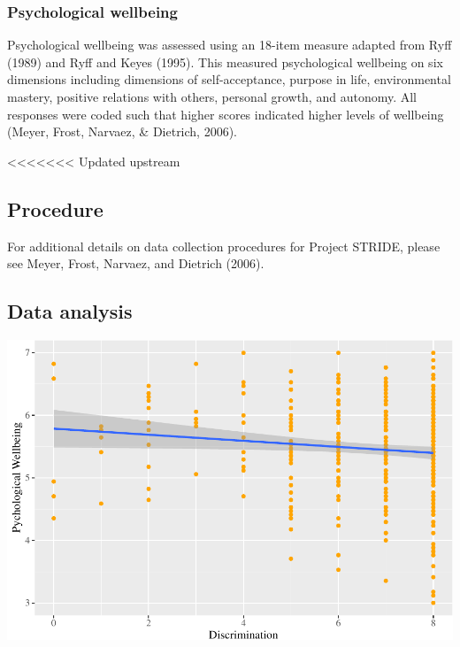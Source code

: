 \documentclass[
  english,
  man,floatsintext]{apa6}
\begin{document}
\hypertarget{psychological-wellbeing}{%
\subsubsection{Psychological wellbeing}\label{psychological-wellbeing}}

Psychological wellbeing was assessed using an 18-item measure adapted from Ryff (1989) and Ryff and Keyes (1995). This measured psychological wellbeing on six dimensions including dimensions of self-acceptance, purpose in life, environmental mastery, positive relations with others, personal growth, and autonomy. All responses were coded such that higher scores indicated higher levels of wellbeing (Meyer, Frost, Narvaez, \& Dietrich, 2006).

<<<<<<< Updated upstream
\hypertarget{procedure-1}{%
\subsection{Procedure}\label{procedure-1}}

For additional details on data collection procedures for Project STRIDE, please see Meyer, Frost, Narvaez, and Dietrich (2006).

\hypertarget{data-analysis-1}{%
\subsection{Data analysis}\label{data-analysis-1}}

\includegraphics{prep_script_files/figure-latex/regplot-1.pdf}
\end{document}
